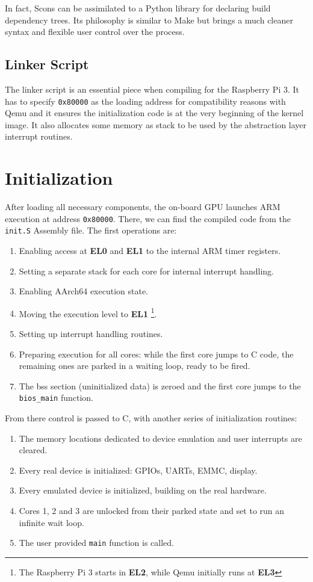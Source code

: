 \documentclass[12pt,a4paper,openright,twoside]{report}
\begin{document}
In fact, Scons can be assimilated to a Python library for declaring build dependency
trees. Its philosophy is similar to Make but brings a much cleaner syntax and 
flexible user control over the process. 

\subsection{Linker Script}
The linker script is an essential piece when compiling for the Raspberry Pi 3. It has
to specify {\tt 0x80000} as the loading address for compatibility reasons with Qemu
and it ensures the initialization code is at the very beginning of the kernel image.
It also allocates some memory as stack to be used by the abstraction layer interrupt
routines.

\section{Initialization}
After loading all necessary components, the on-board GPU launches ARM execution at 
address {\tt 0x80000}. There, we can find the compiled code from the 
{\tt init.S} Assembly file.
The first operations are:
\begin{enumerate}
    \item Enabling access at \textbf{EL0} and \textbf{EL1} to the internal ARM 
        timer registers.
    \item Setting a separate stack for each core for internal interrupt handling.
    \item Enabling AArch64 execution state.
    \item Moving the execution level to \textbf{EL1} \footnote{The Raspberry Pi 3
     starts in \textbf{EL2}, while Qemu initially runs at \textbf{EL3}}.
    \item Setting up interrupt handling routines.
    \item Preparing execution for all cores: while the first core jumps to C code,
        the remaining ones are parked in a waiting loop, ready to be fired.
    \item The bss section (uninitialized data) is zeroed and the first core jumps
        to the {\tt bios\_main} function.
\end{enumerate}

From there control is passed to C, with another series of initialization routines:
\begin{enumerate}
    \item The memory locations dedicated to device emulation and user interrupts
        are cleared.
    \item Every real device is initialized: GPIOs, UARTs, EMMC, display.
    \item Every emulated device is initialized, building on the real hardware.
    \item Cores 1, 2 and 3 are unlocked from their parked state and set to 
        run an infinite wait loop.
    \item The user provided {\tt main} function is called.
\end{enumerate}
\end{document}
